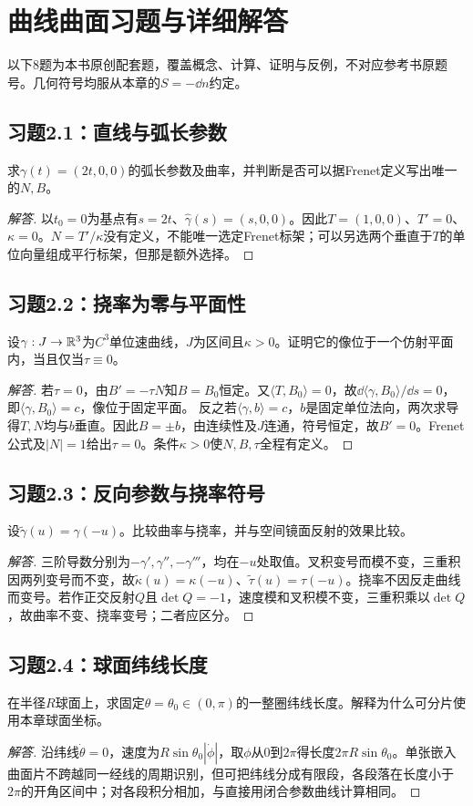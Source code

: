 \section{曲线曲面习题与详细解答}
以下8题为本书原创配套题，覆盖概念、计算、证明与反例，不对应参考书原题号。几何符号均服从本章的$S=-\dd n$约定。
\subsection*{习题2.1：直线与弧长参数}
求$\gamma(t)=(2t,0,0)$的弧长参数及曲率，并判断是否可以据Frenet定义写出唯一的$N,B$。
\begin{proof}[解答]
以$t_0=0$为基点有$s=2t$、$\widehat\gamma(s)=(s,0,0)$。因此$T=(1,0,0)$、$T'=0$、$\kappa=0$。$N=T'/\kappa$没有定义，不能唯一选定Frenet标架；可以另选两个垂直于$T$的单位向量组成平行标架，但那是额外选择。
\end{proof}
\subsection*{习题2.2：挠率为零与平面性}
设$\gamma:J\to\mathbb{R}^3$为$C^3$单位速曲线，$J$为区间且$\kappa>0$。证明它的像位于一个仿射平面内，当且仅当$\tau\equiv0$。
\begin{proof}[解答]
若$\tau=0$，由$B'=-\tau N$知$B=B_0$恒定。又$\langle T,B_0\rangle=0$，故$\dd\langle\gamma,B_0\rangle/\dd s=0$，即$\langle\gamma,B_0\rangle=c$，像位于固定平面。
反之若$\langle\gamma,b\rangle=c$，$b$是固定单位法向，两次求导得$T,N$均与$b$垂直。因此$B=\pm b$，由连续性及$J$连通，符号恒定，故$B'=0$。Frenet公式及$|N|=1$给出$\tau=0$。条件$\kappa>0$使$N,B,\tau$全程有定义。
\end{proof}
\subsection*{习题2.3：反向参数与挠率符号}
设$\widetilde\gamma(u)=\gamma(-u)$。比较曲率与挠率，并与空间镜面反射的效果比较。
\begin{proof}[解答]
三阶导数分别为$-\gamma',\gamma'',-\gamma'''$，均在$-u$处取值。叉积变号而模不变，三重积因两列变号而不变，故$\widetilde\kappa(u)=\kappa(-u)$、$\widetilde\tau(u)=\tau(-u)$。挠率不因反走曲线而变号。若作正交反射$Q$且$\det Q=-1$，速度模和叉积模不变，三重积乘以$\det Q$，故曲率不变、挠率变号；二者应区分。
\end{proof}
\subsection*{习题2.4：球面纬线长度}
在半径$R$球面上，求固定$\theta=\theta_0\in(0,\pi)$的一整圈纬线长度。解释为什么可分片使用本章球面坐标。
\begin{proof}[解答]
沿纬线$\dot\theta=0$，速度为$R\sin\theta_0|\dot\phi|$，取$\phi$从$0$到$2\pi$得长度$2\pi R\sin\theta_0$。单张嵌入曲面片不跨越同一经线的周期识别，但可把纬线分成有限段，各段落在长度小于$2\pi$的开角区间中；对各段积分相加，与直接用闭合参数曲线计算相同。
\end{proof}
